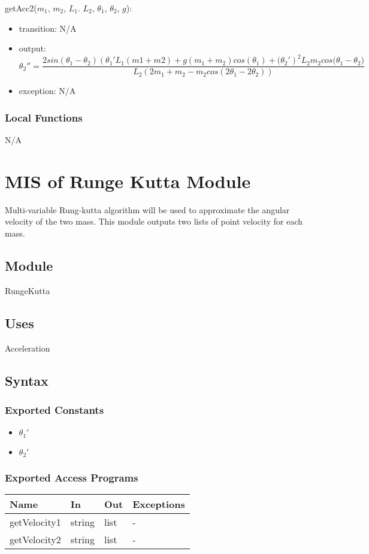 \documentclass[12pt, titlepage]{article}
\begin{document}
\noindent getAcc2($m_1$, $m_2$, $L_1$. $L_2$, $\theta_1$, $\theta_2$, $g$):
\begin{itemize}
\item transition: N/A 
\item output: 
\[{\theta_2}''=\frac{2sin(\theta_1-\theta_2)({\theta_1}'L_1(m1+m2)+g(m_1+m_2)cos(\theta_1)+{(\theta_2}')^2L_2m_2cos(\theta_1-\theta_2\big)}{L_2(2m_1+m_2-m_2cos(2\theta_1-2\theta_2))}\]
\item exception: N/A
\end{itemize}

\subsubsection{Local Functions}

N/A
\newpage
\section{MIS of Runge Kutta Module} \label{RKModule} 
Multi-variable Rung-kutta algorithm will be used to approximate the angular velocity of the two mass. \cite{RungeKutta} This module outputs two lists of point velocity for each mass. 
\subsection{Module}
RungeKutta
\subsection{Uses}
Acceleration

\subsection{Syntax}

\subsubsection{Exported Constants}
\begin{itemize}
  \item ${\theta_1}'$
  \item ${\theta_2}'$
\end{itemize}
\subsubsection{Exported Access Programs}

\begin{center}
\begin{tabular}{p{2cm} p{4cm} p{4cm} p{2cm}}
\hline
\textbf{Name} & \textbf{In} & \textbf{Out} & \textbf{Exceptions} \\
\hline
getVelocity1 & string & list & - \\
\hline
getVelocity2 & string & list & - \\
\hline
\end{tabular}
\end{center}
\end{document}

